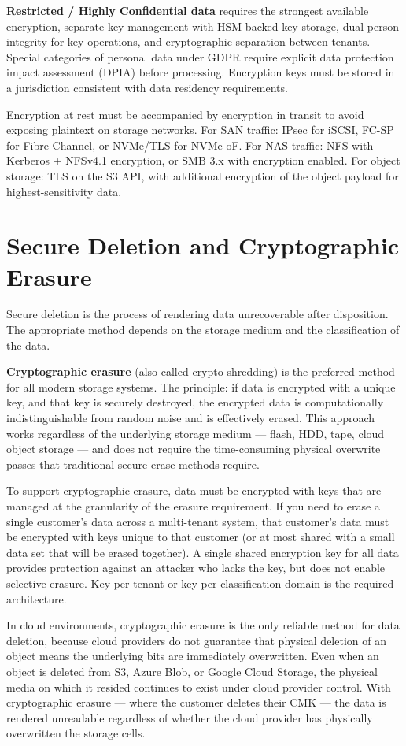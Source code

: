 \textbf{Restricted / Highly Confidential data} requires the strongest available encryption, separate key management with HSM-backed key storage, dual-person integrity for key operations, and cryptographic separation between tenants. Special categories of personal data under GDPR require explicit data protection impact assessment (DPIA) before processing. Encryption keys must be stored in a jurisdiction consistent with data residency requirements.

Encryption at rest must be accompanied by encryption in transit to avoid exposing plaintext on storage networks. For SAN traffic: IPsec for iSCSI, FC-SP for Fibre Channel, or NVMe/TLS for NVMe-oF. For NAS traffic: NFS with Kerberos + NFSv4.1 encryption, or SMB 3.x with encryption enabled. For object storage: TLS on the S3 API, with additional encryption of the object payload for highest-sensitivity data.

\section{Secure Deletion and Cryptographic Erasure}
Secure deletion is the process of rendering data unrecoverable after disposition. The appropriate method depends on the storage medium and the classification of the data.

\textbf{Cryptographic erasure} (also called crypto shredding) is the preferred method for all modern storage systems. The principle: if data is encrypted with a unique key, and that key is securely destroyed, the encrypted data is computationally indistinguishable from random noise and is effectively erased. This approach works regardless of the underlying storage medium --- flash, HDD, tape, cloud object storage --- and does not require the time-consuming physical overwrite passes that traditional secure erase methods require.

To support cryptographic erasure, data must be encrypted with keys that are managed at the granularity of the erasure requirement. If you need to erase a single customer's data across a multi-tenant system, that customer's data must be encrypted with keys unique to that customer (or at most shared with a small data set that will be erased together). A single shared encryption key for all data provides protection against an attacker who lacks the key, but does not enable selective erasure. Key-per-tenant or key-per-classification-domain is the required architecture.

In cloud environments, cryptographic erasure is the only reliable method for data deletion, because cloud providers do not guarantee that physical deletion of an object means the underlying bits are immediately overwritten. Even when an object is deleted from S3, Azure Blob, or Google Cloud Storage, the physical media on which it resided continues to exist under cloud provider control. With cryptographic erasure --- where the customer deletes their CMK --- the data is rendered unreadable regardless of whether the cloud provider has physically overwritten the storage cells.

